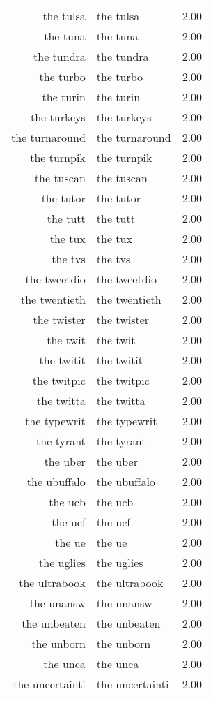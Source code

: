 \begin{table}[ht]
\begin{tabular}{rlr}
  the tulsa & the tulsa & 2.00 \\ 
  the tuna & the tuna & 2.00 \\ 
  the tundra & the tundra & 2.00 \\ 
  the turbo & the turbo & 2.00 \\ 
  the turin & the turin & 2.00 \\ 
  the turkeys & the turkeys & 2.00 \\ 
  the turnaround & the turnaround & 2.00 \\ 
  the turnpik & the turnpik & 2.00 \\ 
  the tuscan & the tuscan & 2.00 \\ 
  the tutor & the tutor & 2.00 \\ 
  the tutt & the tutt & 2.00 \\ 
  the tux & the tux & 2.00 \\ 
  the tvs & the tvs & 2.00 \\ 
  the tweetdio & the tweetdio & 2.00 \\ 
  the twentieth & the twentieth & 2.00 \\ 
  the twister & the twister & 2.00 \\ 
  the twit & the twit & 2.00 \\ 
  the twitit & the twitit & 2.00 \\ 
  the twitpic & the twitpic & 2.00 \\ 
  the twitta & the twitta & 2.00 \\ 
  the typewrit & the typewrit & 2.00 \\ 
  the tyrant & the tyrant & 2.00 \\ 
  the uber & the uber & 2.00 \\ 
  the ubuffalo & the ubuffalo & 2.00 \\ 
  the ucb & the ucb & 2.00 \\ 
  the ucf & the ucf & 2.00 \\ 
  the ue & the ue & 2.00 \\ 
  the uglies & the uglies & 2.00 \\ 
  the ultrabook & the ultrabook & 2.00 \\ 
  the unansw & the unansw & 2.00 \\ 
  the unbeaten & the unbeaten & 2.00 \\ 
  the unborn & the unborn & 2.00 \\ 
  the unca & the unca & 2.00 \\ 
  the uncertainti & the uncertainti & 2.00 \\ 

\end{tabular}
\end{table}

